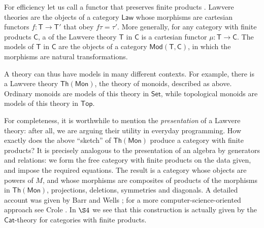 \documentclass{amsart}
\newcommand{\define}[1]{{\bf \boldmath{#1}}}
\theoremstyle{definition}
\newcommand{\Th}{\mathsf{Th}}
\newcommand{\Set}{\mathsf{Set}}
\newcommand{\Cat}{\mathsf{Cat}}
\newcommand{\Law}{\mathsf{Law}}
\newcommand{\Top}{\mathsf{Top}}
\newcommand{\Mon}{\mathsf{Mon}}
\newcommand{\Mod}{\mathsf{Mod}}
\newcommand{\C}{\mathsf{C}}
\newcommand{\T}{\mathsf{T}}
\newcommand{\maps}{\colon}
\begin{document}
For efficiency let us call a functor that preserves finite products \define{cartesian}.   Lawvere theories are the objects of a category $\Law$ whose morphisms are cartesian functors $f \maps \T\to \T'$ that obey $f\tau = \tau'$.   More generally, for any category with finite products $\C$, a \define{model} of the Lawvere theory $\T$ in $\C$ is a cartesian functor $\mu \maps \T \to \C$.  The models of $\T$ in $\C$ are the objects of a category $\Mod(\T,\C)$, in which the morphisms are natural transformations.  

A theory can thus have models in many different contexts.   For example, there is a Lawvere theory $\Th(\Mon)$, the theory of monoids, described as above.  Ordinary monoids are models of this theory in $\Set$, while topological monoids are models of this theory in $\Top$.

For completeness, it is worthwhile to mention the \textit{presentation} of a Lawvere theory: after all, we are arguing their utility in everyday programming.  How exactly does the above ``sketch'' of $\Th(\Mon)$ produce a category with finite products?  It is precisely analogous to the presentation of an algebra by generators and relations: we form the free category with finite products on the data given, and impose the required equations. The result is a category whose objects are powers of $M$, and whose morphisms are composites of products of the morphisms in $\Th(\Mon)$, projections, deletions, symmetries and diagonals.  A detailed account was given by Barr and Wells \cite[Chap.\ 4]{barrwells}; for a more computer-science-oriented approach see Crole \cite[Chap.\ 3]{crole}. In $\S4$ we see that this construction is actually given by the $\Cat$-theory for categories with finite products.
\end{document}
